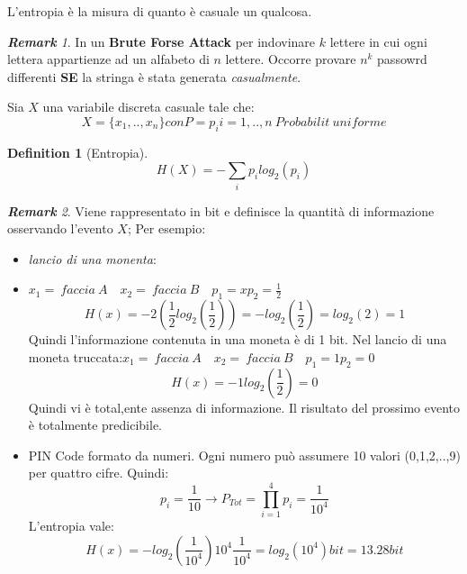 \documentclass{article}
\newtheorem{definition}{Definition}[section]
\theoremstyle{remark}
\newtheorem*{remark}{\textbf{Remark}}
\begin{document}
\begin{enumerate}
	      L'entropia è la misura di quanto è casuale un qualcosa.
	      \begin{remark}
		      In un \textbf{Brute Forse Attack} per indovinare $k$ lettere in cui ogni lettera appartienze ad un alfabeto di $n$ lettere. Occorre provare $n^k$ passowrd differenti \textbf{SE} la stringa è stata generata \emph{casualmente}.
	      \end{remark}
	      Sia $X$ una variabile discreta casuale tale che:\begin{equation*}
		      X=\{x_1,..,x_n\} con P=p_i  i=1,..,n\ Probabilit\ uniforme
	      \end{equation*}
	      \begin{definition}[Entropia]
		      \begin{equation*}
			      H(X)=-\sum_ip_ilog_2(p_i)
		      \end{equation*}
	      \end{definition}
	      \begin{remark}
		      Viene rappresentato in bit e definisce la quantità di informazione osservando l'evento $X$; Per esempio:\begin{itemize}
			      \item \emph{lancio di una monenta}:
			      \item $x_1=\ faccia\ A\quad x_2=\ faccia\ B\quad p_1=xp_2=\frac{1}{2}$\begin{equation*}
				            H(x)=-2(\frac{1}{2}log_2(\frac{1}{2}))=-log_2(\frac{1}{2})=log_2(2)=1
			            \end{equation*}
			            Quindi l'informazione contenuta in una moneta è di 1 bit.
			            Nel lancio di una moneta truccata:$x_1=\ faccia\ A\quad x_2=\ faccia\ B\quad p_1=1 p_2=0$\begin{equation*}
				            H(x)=-1log_2(\frac{1}{2})=0
			            \end{equation*}
			            Quindi vi è total,ente assenza di informazione. Il risultato del prossimo evento è totalmente predicibile.
			      \item PIN Code formato da numeri. Ogni numero può assumere 10 valori (0,1,2,..,9) per quattro cifre. Quindi:\begin{equation*}
				            p_i=\frac{1}{10}\rightarrow P_{Tot}=\prod_{i=1}^{4}p_i=\frac{1}{10^4}
			            \end{equation*}
			            L'entropia vale:\begin{equation*}
				            H(x)=-log_2(\frac{1}{10^4})10^4\frac{1}{10^4}=log_2(10^4) bit = 13.28bit

\end{equation*}
\end{itemize}
\end{remark}
\end{enumerate}
\end{document}
